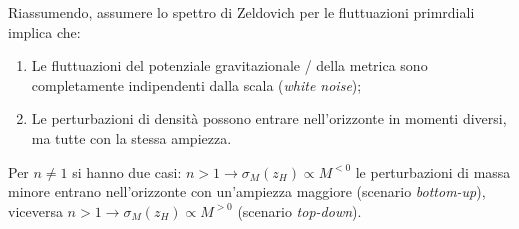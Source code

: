 Riassumendo, assumere lo spettro di Zeldovich per le fluttuazioni primrdiali implica che:
\begin{enumerate}
    \item Le fluttuazioni del potenziale gravitazionale / della metrica sono completamente indipendenti dalla scala (\textit{white noise});
    \item Le perturbazioni di densità possono entrare nell’orizzonte in momenti diversi, ma tutte con la stessa ampiezza.
\end{enumerate}

Per $n\neq1$ si hanno due casi: $n>1 \rightarrow \sigma_M (z_H)\propto M^{<0}$ le perturbazioni di massa minore entrano nell’orizzonte con un'ampiezza maggiore (scenario \textit{bottom-up}), viceversa $n>1 \rightarrow \sigma_M (z_H)\propto M^{>0}$ (scenario \textit{top-down}).

